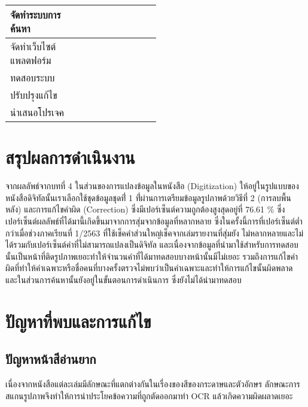 \begin{table}[H]
\begin{tabular}{|p{0.5\linewidth}|l|l|l|}
จัดทำระบบการค้นหา                                                                    &                                      &           &  \cellcolor[HTML]{92D050}                               \\ \hline
จัดทำเว็บไซต์แพลตฟอร์ม                                                               &                                      &                                     & \cellcolor[HTML]{92D050}       \\ \hline
ทดสอบระบบ                                                                            &                                      &            &  \cellcolor[HTML]{92D050}                               \\ \hline
ปรับปรุงแก้ไข                                                                        &                                      & 	            &   \cellcolor[HTML]{92D050}                             \\ \hline
นำเสนอโปรเจค                                                                         &                 & 	               &    \cellcolor[HTML]{92D050}                             \\ \hline
\end{tabular}
\end{table}
\section{สรุปผลการดำเนินงาน}
จากผลลัพธ์จากบทที่ 4 ในส่วนของการแปลงข้อมูลในหนังสือ (Digitization) ให้อยู่ในรูปแบบของหนังสือดิจิทัลนั้นเราเลือกใช้ชุดข้อมูลชุดที่่ 1 
ที่่ผ่านการเตรียมข้อมูลรูปภาพด้วยวิธีที่ 2 (การลบพื้นหลัง) และการแก้ไขคำผิด (Correction) ซึ่งมีเปอร์เซ็นต์ความถูกต้องสูงสุดอยู่ที่ 76.61 \%
ซึ่งเปอร์เซ็นต์ผลลัพธ์ที่ได้มานี้เกิดขึ้นมาจากการสุ่มจากข้อมูลที่หลากหลาย ซึ่งในครั้งนี้การที่เปอร์เซ็นต์ต่ำกว่าเมื่อช่วงภาคเรียนที่ 1/2563 ที่ใช้เช็คคำส่วนใหญ่เช็คจากเล่มรายงานที่สุ่มยัง
ไม่หลากหลายและไม่ได้รวมกับเปอร์เซ็นต์คำที่ไม่สามารถแปลงเป็นดิจิทัล และเนื่องจากข้อมูลที่นำมาใช้สำหรับการทดสอบนั้นเป็นหน้าที่ติดรูปภาพเยอะทำให้จำนวนคำที่ได้มาทดสอบบางหน้านั้นมีไม่เยอะ
รวมถึงการแก้ไขคำผิดที่ทำให้คำเฉพาะหรือชื่อคนที่บางครั้งตรวจไม่พบว่าเป็นคำเฉพาะและทำให้การแก้ไขนั้นผิดพลาด และในส่วนการค้นหานั้นยังอยู่ในขั้นตอนการดำเนินการ ซึ่งยังไม่ได้นำมาทดสอบ

\section{ปัญหาที่พบและการแก้ไข}
\subsection{ปัญหาหน้าสีอ่านยาก}
เนื่องจากหนังสือแต่ละเล่มมีลักษณะที่แตกต่างกันในเรื่องของสีของกระดาษและตัวอักษร ลักษณะการสแกนรูปภาพจึงทำให้การนำประโยคข้อความที่ถูกตัดออกมาทำ OCR แล้วเกิดความผิดผลาดเยอะ

